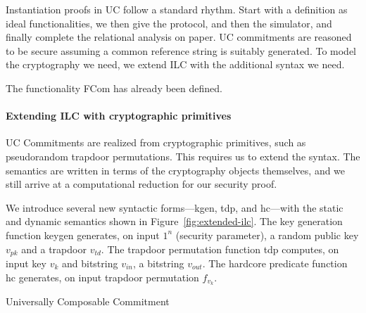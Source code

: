 Instantiation proofs in UC follow a standard rhythm. Start with a definition as ideal functionalities, we then give the protocol, and then the simulator, and finally complete the relational analysis on paper.
UC commitments are reasoned to be secure assuming a common reference string is suitably generated.
To model the cryptography we need, we extend ILC with the additional syntax we need.

The functionality FCom has already been defined.

\paragraph{Extending ILC with cryptographic primitives}
UC Commitments are realized from cryptographic primitives, such as pseudorandom trapdoor permutations. This requires us to extend the syntax. The semantics are written in terms of the cryptography objects themselves, and we still arrive at a computational reduction for our security proof.

We introduce several new syntactic forms---\textsf{kgen}, \textsf{tdp}, and
\textsf{hc}---with the static and dynamic semantics shown in
Figure~\ref{fig:extended-ilc}.
The key generation function \textsf{keygen} generates, on input $1^n$ (security
parameter), a random public key $v_{pk}$ and a trapdoor $v_{td}$. The trapdoor
permutation function \textsf{tdp} computes, on input key $v_k$ and bitstring
$v_{in}$, a bitstring $v_{out}$. The hardcore predicate function \textsf{hc}
generates, on input trapdoor permutation $f_{v_k}$.



\begin{algorithm}
\DontPrintSemicolon

\smallskip
{}
\smallskip

\caption{Universally Composable Commitment}
\label{alg:com}
\end{algorithm}

